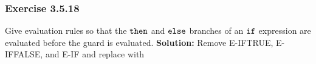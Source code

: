 \subsubsection*{Exercise 3.5.18}
Give evaluation rules so that the $\term{then}$ and $\term{else}$ branches of an $\term{if}$ expression
are evaluated before the guard is evaluated.\newline
\textbf{Solution:} Remove E-IFTRUE, E-IFFALSE, and E-IF and replace with
\begin{mathpar}




\end{mathpar}


